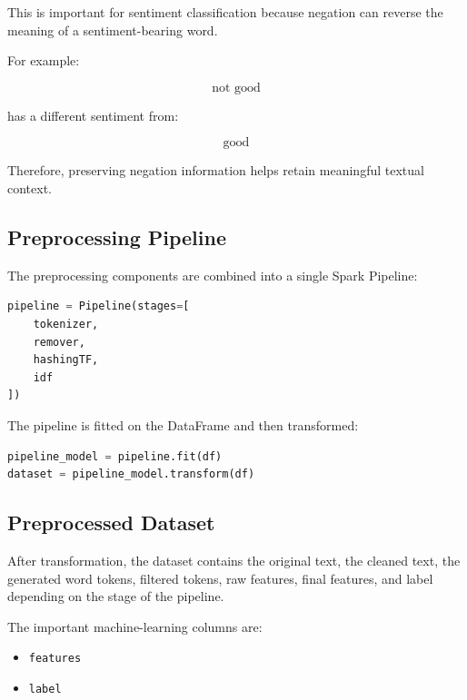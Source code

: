 \documentclass[12pt,a4paper]{article}
\begin{document}
This is important for sentiment classification because negation can reverse the meaning of a sentiment-bearing word.

For example:

\[
\text{not good}
\]

has a different sentiment from:

\[
\text{good}
\]

Therefore, preserving negation information helps retain meaningful textual context.



\subsection{Preprocessing Pipeline}

The preprocessing components are combined into a single Spark Pipeline:

\begin{lstlisting}[language=Python]
pipeline = Pipeline(stages=[
    tokenizer,
    remover,
    hashingTF,
    idf
])
\end{lstlisting}

The pipeline is fitted on the DataFrame and then transformed:

\begin{lstlisting}[language=Python]
pipeline_model = pipeline.fit(df)
dataset = pipeline_model.transform(df)
\end{lstlisting}

\subsection{Preprocessed Dataset}

After transformation, the dataset contains the original text, the cleaned text, the generated word tokens, filtered tokens, raw features, final features, and label depending on the stage of the pipeline.

The important machine-learning columns are:

\begin{itemize}
    \item \texttt{features}
    \item \texttt{label}
\end{itemize}



\newpage
\end{document}
